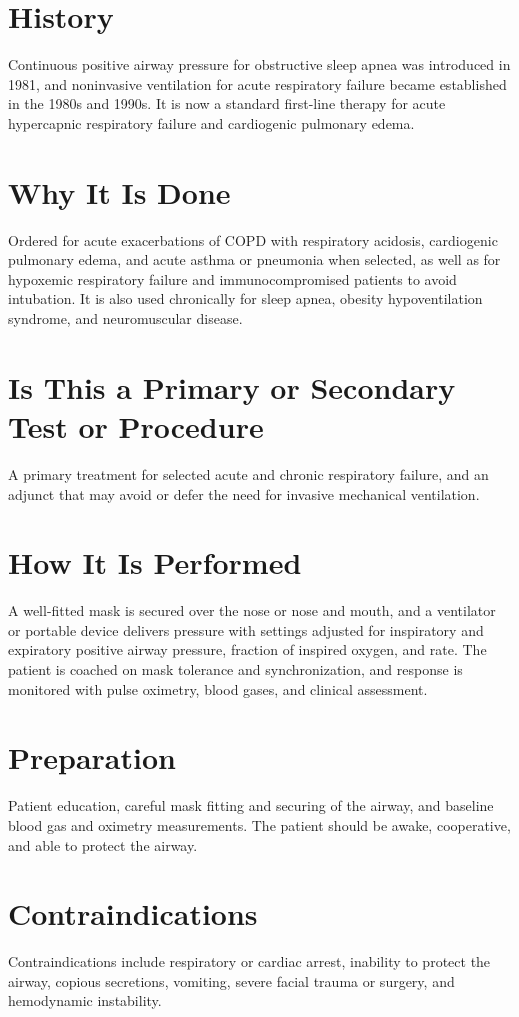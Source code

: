 \section*{History}
Continuous positive airway pressure for obstructive sleep apnea was introduced in 1981, and noninvasive ventilation for acute respiratory failure became established in the 1980s and 1990s. It is now a standard first-line therapy for acute hypercapnic respiratory failure and cardiogenic pulmonary edema.

\section*{Why It Is Done}
Ordered for acute exacerbations of COPD with respiratory acidosis, cardiogenic pulmonary edema, and acute asthma or pneumonia when selected, as well as for hypoxemic respiratory failure and immunocompromised patients to avoid intubation. It is also used chronically for sleep apnea, obesity hypoventilation syndrome, and neuromuscular disease.

\section*{Is This a Primary or Secondary Test or Procedure}
A primary treatment for selected acute and chronic respiratory failure, and an adjunct that may avoid or defer the need for invasive mechanical ventilation.

\section*{How It Is Performed}
A well-fitted mask is secured over the nose or nose and mouth, and a ventilator or portable device delivers pressure with settings adjusted for inspiratory and expiratory positive airway pressure, fraction of inspired oxygen, and rate. The patient is coached on mask tolerance and synchronization, and response is monitored with pulse oximetry, blood gases, and clinical assessment.

\section*{Preparation}
Patient education, careful mask fitting and securing of the airway, and baseline blood gas and oximetry measurements. The patient should be awake, cooperative, and able to protect the airway.

\section*{Contraindications}
Contraindications include respiratory or cardiac arrest, inability to protect the airway, copious secretions, vomiting, severe facial trauma or surgery, and hemodynamic instability.

